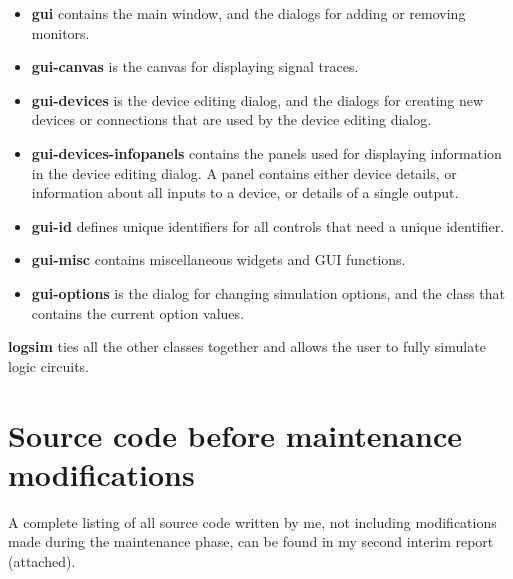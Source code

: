 \documentclass[a4paper,10pt]{article}
\begin{document}
\begin{itemize}
 \item \textbf{gui} contains the main window, and the dialogs for adding or removing monitors.
 \item \textbf{gui-canvas} is the canvas for displaying signal traces.
 \item \textbf{gui-devices} is the device editing dialog, and the dialogs for creating new devices or connections that are used by the device editing dialog.
 \item \textbf{gui-devices-infopanels} contains the panels used for displaying information in the device editing dialog. A panel contains either device details, or information about all inputs to a device, or details of a single output.
 \item \textbf{gui-id} defines unique identifiers for all controls that need a unique identifier.
 \item \textbf{gui-misc} contains miscellaneous widgets and GUI functions.
 \item \textbf{gui-options} is the dialog for changing simulation options, and the class that contains the current option values.
\end{itemize}

\textbf{logsim} ties all the other classes together and allows the user to fully simulate logic circuits.


\clearpage
\section{Source code before maintenance modifications}
\label{sec:report2}

A complete listing of all source code written by me, not including modifications made during the maintenance phase, can be found in my second interim report (attached).
\end{document}
